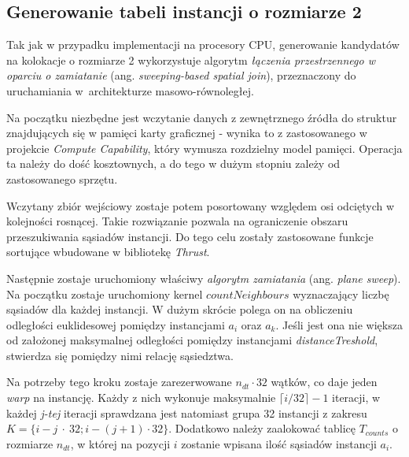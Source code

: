 \documentclass[12pt]{article}
\begin{document}


\subsection{Generowanie tabeli instancji o rozmiarze 2}

Tak jak w przypadku implementacji na procesory CPU, generowanie kandydatów na kolokacje o rozmiarze 2 wykorzystuje algorytm \textit{łączenia przestrzennego w oparciu o zamiatanie} (ang. \textit{sweeping-based spatial join}), przeznaczony do uruchamiania w~architekturze masowo-równoległej. 

Na początku niezbędne jest wczytanie danych z zewnętrznego źródła do struktur znajdujących się w pamięci karty graficznej - wynika to z zastosowanego w projekcie \textit{Compute Capability}, który wymusza rozdzielny model pamięci. Operacja ta należy do dość kosztownych, a do tego w dużym stopniu zależy od zastosowanego sprzętu.

Wczytany zbiór wejściowy zostaje potem posortowany względem osi odciętych w kolejności rosnącej. Takie rozwiązanie pozwala na ograniczenie obszaru przeszukiwania sąsiadów instancji. Do tego celu zostały zastosowane funkcje sortujące wbudowane w bibliotekę \textit{Thrust}.

Następnie zostaje uruchomiony właściwy \textit{algorytm zamiatania} (ang. \textit{plane sweep}). Na początku zostaje uruchomiony kernel $ countNeighbours $ wyznaczający liczbę sąsiadów dla każdej instancji. W dużym skrócie polega on na obliczeniu odległości euklidesowej pomiędzy instancjami $ a_{i} $ oraz $ a_{k} $. Jeśli jest ona nie większa od założonej maksymalnej odległości pomiędzy instancjami \textit{distanceTreshold}, stwierdza się pomiędzy nimi relację sąsiedztwa. 

Na potrzeby tego kroku zostaje zarezerwowane $ n_{dt} \cdot 32 $ wątków, co daje jeden \textit{warp} na instancję. Każdy z nich wykonuje maksymalnie $\lceil i / 32\rceil - 1$ iteracji, w każdej \textit{j-tej} iteracji sprawdzana jest natomiast grupa 32 instancji z zakresu $ K=\{i - j~\cdot~32; i - (j + 1) \cdot 32\} $. Dodatkowo należy zaalokować tablicę $ T_{counts} $ o rozmiarze $ n_{dt} $, w której na pozycji $ i $ zostanie wpisana ilość sąsiadów instancji $ a_{i} $.
\end{document}
